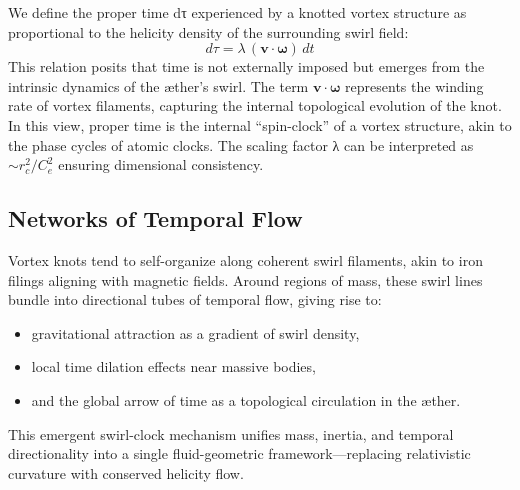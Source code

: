 We define the proper time dτ experienced by a knotted vortex structure as proportional to the helicity density of the surrounding swirl field:
$$ d\tau = \lambda \, (\mathbf{v} \cdot \boldsymbol{\omega}) \, dt $$
This relation posits that time is not externally imposed but emerges from the intrinsic dynamics of the æther’s swirl. The term $\mathbf{v} \cdot \boldsymbol{\omega}$ represents the winding rate of vortex filaments, capturing the internal topological evolution of the knot. In this view, proper time is the internal “spin-clock” of a vortex structure, akin to the phase cycles of atomic clocks. The scaling factor λ can be interpreted as $\sim r_c^2 / C_e^2$ ensuring dimensional consistency.

\subsection*{Networks of Temporal Flow}

Vortex knots tend to self-organize along coherent swirl filaments, akin to iron filings aligning with magnetic fields. Around regions of mass, these swirl lines bundle into directional tubes of temporal flow, giving rise to:
\begin{itemize}
    \item gravitational attraction as a gradient of swirl density,
    \item local time dilation effects near massive bodies,
    \item and the global arrow of time as a topological circulation in the æther.
\end{itemize}

This emergent swirl-clock mechanism unifies mass, inertia, and temporal directionality into a single fluid-geometric framework—replacing relativistic curvature with conserved helicity flow.

